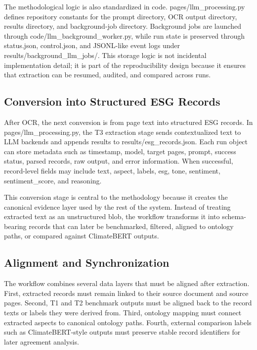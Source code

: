 \documentclass[english, online, cse, master]{dithesis}
\begin{document}
The methodological logic is also standardized in code. pages/llm\_processing.py defines repository constants for the prompt directory, OCR output directory, results directory, and background-job directory. Background jobs are launched through code/llm\_background\_worker.py, while run state is preserved through status.json, control.json, and JSONL-like event logs under results/background\_llm\_jobs/. This storage logic is not incidental implementation detail; it is part of the reproducibility design because it ensures that extraction can be resumed, audited, and compared across runs.

\subsection{Conversion into Structured ESG Records}

After OCR, the next conversion is from page text into structured ESG records. In pages/llm\_processing.py, the T3 extraction stage sends contextualized text to LLM backends and appends results to results/esg\_records.json. Each run object can store metadata such as timestamp, model, target pages, prompt, success status, parsed records, raw output, and error information. When successful, record-level fields may include text, aspect, labels, esg, tone, sentiment, sentiment\_score, and reasoning.

This conversion stage is central to the methodology because it creates the canonical evidence layer used by the rest of the system. Instead of treating extracted text as an unstructured blob, the workflow transforms it into schema-bearing records that can later be benchmarked, filtered, aligned to ontology paths, or compared against ClimateBERT outputs.

\subsection{Alignment and Synchronization}

The workflow combines several data layers that must be aligned after extraction. First, extracted records must remain linked to their source document and source pages. Second, T1 and T2 benchmark outputs must be aligned back to the record texts or labels they were derived from. Third, ontology mapping must connect extracted aspects to canonical ontology paths. Fourth, external comparison labels such as ClimateBERT-style outputs must preserve stable record identifiers for later agreement analysis.
\end{document}
